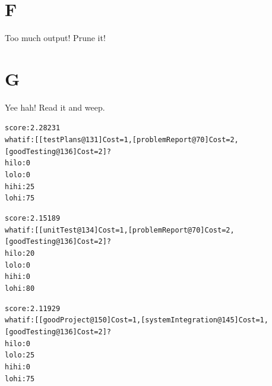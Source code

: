 \documentclass{article}
\begin{document}
\section{F}
Too much output! Prune it!

\section{G}
 Yee hah! Read it and weep.

{\footnotesize \begin{alltt}
          score : 2.28231
        what if : [[testPlans@131]Cost=1, [problemReport@70]Cost=2, [goodTesting@136]Cost=2]?
           hilo :    0%
           lolo :    0%
           hihi :   25%
           lohi :   75%

          score : 2.15189
        what if : [[unitTest@134]Cost=1, [problemReport@70]Cost=2, [goodTesting@136]Cost=2]?
           hilo :   20%
           lolo :    0%
           hihi :    0%
           lohi :   80%

          score : 2.11929
        what if : [[goodProject@150]Cost=1, [systemIntegration@145]Cost=1, [goodTesting@136]Cost=2]?
           hilo :    0%
           lolo :   25%
           hihi :    0%
           lohi :   75%
\end{alltt}}
\end{document}
